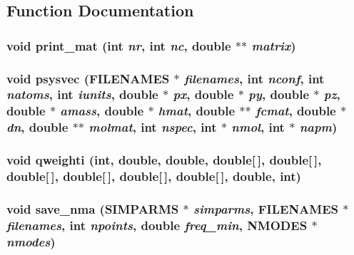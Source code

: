 \subsection{Function Documentation}
\subsubsection{\setlength{\rightskip}{0pt plus 5cm}void print\_\-mat (int {\em nr}, int {\em nc}, double $\ast$$\ast$ {\em matrix})}\label{nmaout_8c_e03c8642bacdbe20ef827ce0ff30a31e}


\subsubsection{\setlength{\rightskip}{0pt plus 5cm}void psysvec ({\bf FILENAMES} $\ast$ {\em filenames}, int {\em nconf}, int {\em natoms}, int {\em iunits}, double $\ast$ {\em px}, double $\ast$ {\em py}, double $\ast$ {\em pz}, double $\ast$ {\em amass}, double $\ast$ {\em hmat}, double $\ast$$\ast$ {\em fcmat}, double $\ast$ {\em dn}, double $\ast$$\ast$ {\em molmat}, int {\em nspec}, int $\ast$ {\em nmol}, int $\ast$ {\em napm})}\label{nmaout_8c_cd4b3a12c5310bc05e780a2ff5e852ce}


\subsubsection{\setlength{\rightskip}{0pt plus 5cm}void qweighti (int, double, double, double[$\,$], double[$\,$], double[$\,$], double[$\,$], double[$\,$], double[$\,$], double, int)\hspace{0.3cm}{\tt  [static]}}\label{nmaout_8c_324ab305c13a65f7519ba736664767d9}


\subsubsection{\setlength{\rightskip}{0pt plus 5cm}void save\_\-nma ({\bf SIMPARMS} $\ast$ {\em simparms}, {\bf FILENAMES} $\ast$ {\em filenames}, int {\em npoints}, double {\em freq\_\-min}, {\bf NMODES} $\ast$ {\em nmodes})}\label{nmaout_8c_07b4b3619b8dde69bf89cabcab0c086d}


